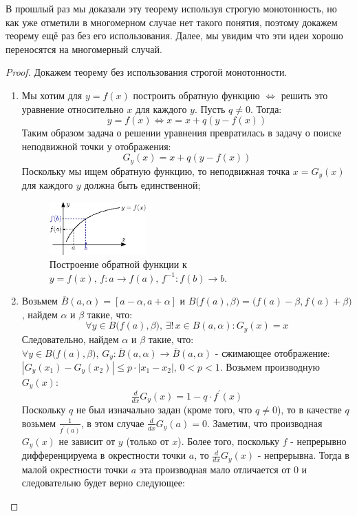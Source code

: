 \documentclass[12pt]{article}
\theoremstyle{definition}
\begin{document}
В прошлый раз мы доказали эту теорему используя строгую монотонность, но как уже отметили в многомерном случае нет такого понятия, поэтому докажем теорему ещё раз без его использования. Далее, мы увидим что эти идеи хорошо переносятся на многомерный случай.
\begin{proof} Докажем теорему без использования строгой монотонности. \hfill
	\begin{enumerate}[label ={(\arabic*)}]
		\item Мы хотим для $y = f(x)$ построить обратную функцию $\Leftrightarrow$ решить это уравнение относительно $x$ для каждого $y$.
		Пусть $q \neq 0$. Тогда:
		$$
			y = f(x) \Leftrightarrow x = x + q(y - f(x))
		$$
		Таким образом задача о решении уравнения превратилась в задачу о поиске неподвижной точки у отображения: 
		$$
			G_y(x) = x + q(y - f(x))
		$$
		Поскольку мы ищем обратную функцию, то неподвижная точка $x = G_y(x)$ для каждого $y$ должна быть единственной;
		\begin{figure}[H]
			\centering
			\includegraphics[width=0.35\textwidth]{15_1.eps}
			\caption{Построение обратной функции к $y = f(x),\, f\colon a \to f(a), \, f^{-1}\colon f(b) \to b$.}
			\label{15_1}
		\end{figure}
		\item Возьмем $\overline{B}(a,\alpha) = [a-\alpha,a+ \alpha]$ и $B\big(f(a),\beta\big) = \big(f(a)	- \beta, f(a) + \beta \big)$, найдем $\alpha$ и $\beta$ такие, что:
		$$
			\forall y \in B\big(f(a),\beta\big), \, \exists! \, x \in B(a,\alpha) \colon G_y(x) = x
		$$
		Следовательно, найдем $\alpha$ и $\beta$ такие, что: $\forall y \in B\big(f(a),\beta\big), \, G_y \colon \overline{B}(a,\alpha) \to \overline{B}(a,\alpha)$ - сжимающее отображение: $|G_y(x_1) - G_y(x_2)| \leq p{\cdot}|x_1 - x_2|, \, 0 < p < 1$.
		Возьмем производную $G_y(x)$: 
		$$
			\tfrac{d}{dx}G_y(x) = 1 - q{\cdot}f^\prime(x)
		$$
		Поскольку $q$ не был изначально задан (кроме того, что $q \neq 0$), то в качестве $q$ возьмем $\tfrac{1}{f^\prime(a)}$, в этом случае $\tfrac{d}{dx}G_y(a) = 0$. Заметим, что производная $G_y(x)$ не зависит от $y$ (только от $x$). Более того, поскольку $f$ - непрерывно дифференцируема в окрестности точки $a$, то $\tfrac{d}{dx}G_y(x)$ - непрерывна. Тогда в малой окрестности точки $a$ эта производная мало отличается от $0$ и следовательно будет верно следующее:

\end{enumerate}
\end{proof}
\end{document}
